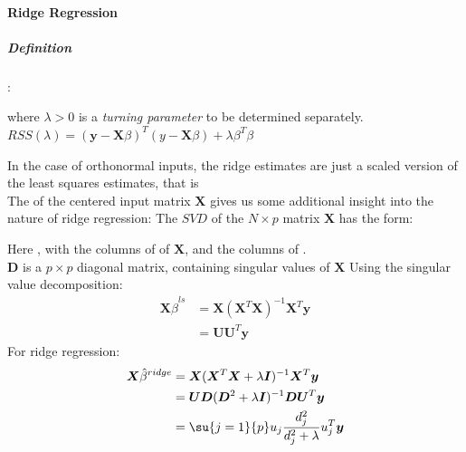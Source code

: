 \paragraph{Ridge Regression}
\subparagraph{Definition}
:
\begin{center}
\end{center}
where $\lambda > 0$ is a \emph{turning parameter} to be determined 
separately.\\
$RSS(\lambda)=(\bm{y}-\bm{X}\beta)^{T}(y-\bm{X}\beta)+\lambda\beta^{T}\beta$\\
\begin{center}
\end{center}
In the case of orthonormal inputs, the ridge estimates are just a
scaled version of the least squares estimates, that is 
\\
The  of the centered input matrix
$\bm{X}$ gives us some additional insight into the nature of ridge 
regression:
The $SVD$ of the $N\times p$ matrix $\bm{X}$ has the form:
\begin{center}
\end{center}
Here , with the columns of  of
$\bm{X}$, and the columns of .\\
$\bm{D}$ is a $p\times p$ diagonal matrix, containing singular values
of $\bm{X}$
Using the singular value decomposition:
\begin{align*}
	\bm{X}\hat{\beta}^{ls} &= \bm{X}(\bm{X}^{T}\bm{X})^{-1}\bm{X}^{T}\bm{y}\\
	&= \bm{U}\bm{U}^{T}\bm{y}
\end{align*}
For ridge regression:
\begin{align*}
	\bm{X}\hat{\beta}^{ridge} &= \bm{X}(\bm{X}^{T}\bm{X}+\lambda\bm{I})^{-1}\bm{X}^{T}\bm{y}\\
	&= \bm{U}\bm{D}(\bm{D}^{2}+\lambda\bm{I})^{-1}\bm{D}\bm{U}^{T}\bm{y}\\
	&= \su{{j=1}}{p}u_{j}\dfrac{d_{j}^{2}}{d_{j}^{2}+\lambda}u_{j}^{T}\bm{y}
\end{align*}
